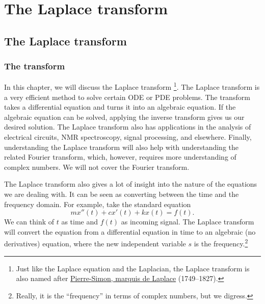 \chapter{The Laplace transform} \label{LT:chapter}


\section{The Laplace transform}
\label{laplace:section}



\subsection{The transform}

In this chapter, we will discuss the Laplace transform%
\footnote{Just like the Laplace equation and the Laplacian, the Laplace
transform is also named after 
\href{https://en.wikipedia.org/wiki/Laplace}{Pierre-Simon, marquis de Laplace}
(1749--1827).}.
The Laplace transform
is a very efficient method to solve certain ODE or PDE problems.
The transform takes a differential equation and turns it into
an algebraic equation.  If the algebraic equation can be solved, applying the
inverse transform gives us our desired solution.
The Laplace transform also has applications in
the analysis of 
electrical circuits, NMR spectroscopy, signal processing, and elsewhere.
Finally,
understanding the Laplace
transform will also help with understanding the related Fourier transform,
which, however, requires more
understanding of complex numbers.  We will not cover the Fourier transform.

The Laplace transform also gives a lot of insight into the nature of the
equations we are dealing with.  It can be seen as converting between the time
and the frequency domain.  For example, take the standard equation
\begin{equation*}
m x''(t) + c x'(t) + k x(t) = f(t) .
\end{equation*}
We can think of $t$ as time and $f(t)$ as incoming signal.  The Laplace
transform will convert the equation from a differential equation in time to
an algebraic (no derivatives) equation, where the new independent variable
$s$ is the frequency.\footnote{Really, it is the ``frequency'' in terms
of complex numbers, but we digress.}

